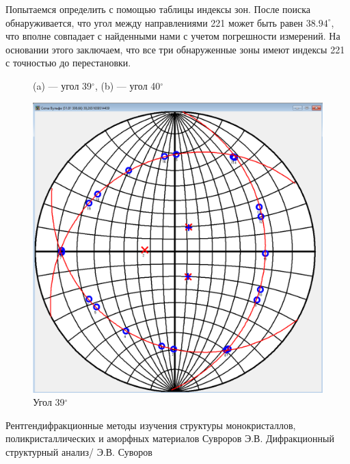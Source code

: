 \documentclass[a4paper, 12pt]{article}
\begin{document}
Попытаемся определить с помощью таблицы индексы зон. После поиска обнаруживается, что угол между направлениями 221 может быть равен $38.94^\circ$, что вполне совпадает с найденными нами с учетом погрешности измерений. На основании этого заключаем, что все три обнаруженные зоны имеют индексы 221 с точностью до перестановки.

\newpage

\begin{figure}[H]
	\centering
	\caption{(a) --- угол 39$^\circ$, (b) --- угол 40$^\circ$}
	\label{fig:12}
\end{figure}

\begin{figure}[H]
	\centering
	\includegraphics[width=0.48\linewidth]{3}
	\caption{Угол 39$^\circ$}
	\label{fig:3}
\end{figure}


\newpage


\begin{thebibliography}{1}
	Рентгендифракционные методы изучения структуры монокристаллов, поликристаллических и аморфных материалов
	Сувроров Э.В. Дифракционный структурный анализ/ Э.В. Суворов
\end{thebibliography}
\end{document}
